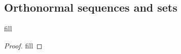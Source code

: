 \subsection{Orthonormal sequences and sets}

\begin{exercise}{1}
fill
\end{exercise}
\begin{proof}
fill
\end{proof}